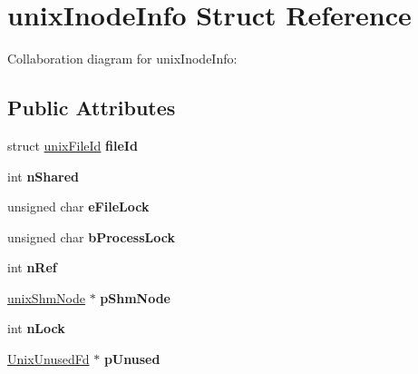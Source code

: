 \hypertarget{structunixInodeInfo}{}\section{unix\+Inode\+Info Struct Reference}
\label{structunixInodeInfo}


Collaboration diagram for unix\+Inode\+Info\+:
\subsection*{Public Attributes}
\begin{DoxyCompactItemize}
\item 
struct \hyperlink{structunixFileId}{unix\+File\+Id} {\bfseries file\+Id}\hypertarget{structunixInodeInfo_ae692731d449f4462a921dda9a061faa6}{}\label{structunixInodeInfo_ae692731d449f4462a921dda9a061faa6}

\item 
int {\bfseries n\+Shared}\hypertarget{structunixInodeInfo_a0d7f8dd92964f53e59c8d741dbe00a61}{}\label{structunixInodeInfo_a0d7f8dd92964f53e59c8d741dbe00a61}

\item 
unsigned char {\bfseries e\+File\+Lock}\hypertarget{structunixInodeInfo_a010a765bb3feecb16b650f68fc3a3c1f}{}\label{structunixInodeInfo_a010a765bb3feecb16b650f68fc3a3c1f}

\item 
unsigned char {\bfseries b\+Process\+Lock}\hypertarget{structunixInodeInfo_ade689e4231dd80bb33c86da1e5ed1586}{}\label{structunixInodeInfo_ade689e4231dd80bb33c86da1e5ed1586}

\item 
int {\bfseries n\+Ref}\hypertarget{structunixInodeInfo_a65cbd1fd05ed00f03a252266b04a8221}{}\label{structunixInodeInfo_a65cbd1fd05ed00f03a252266b04a8221}

\item 
\hyperlink{structunixShmNode}{unix\+Shm\+Node} $\ast$ {\bfseries p\+Shm\+Node}\hypertarget{structunixInodeInfo_a302a8b82e27d5b3624ec122bc9c2ed61}{}\label{structunixInodeInfo_a302a8b82e27d5b3624ec122bc9c2ed61}

\item 
int {\bfseries n\+Lock}\hypertarget{structunixInodeInfo_a477f3357a32adbc1a9b05017e535444d}{}\label{structunixInodeInfo_a477f3357a32adbc1a9b05017e535444d}

\item 
\hyperlink{structUnixUnusedFd}{Unix\+Unused\+Fd} $\ast$ {\bfseries p\+Unused}\hypertarget{structunixInodeInfo_a0dda9ad35734fa161d1f0b13b671c1c6}{}\label{structunixInodeInfo_a0dda9ad35734fa161d1f0b13b671c1c6}


\end{DoxyCompactItemize}

